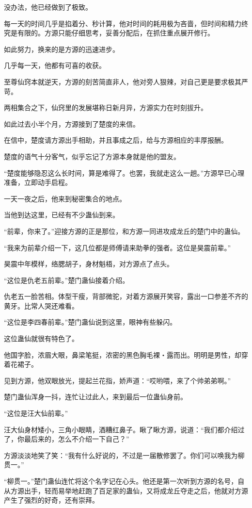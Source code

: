 \begin{this_body}
没办法，他已经做到了极致。

每一天的时间几乎是掐着分、秒计算，他对时间的耗用极为吝啬，但时间和精力终究是有限的。方源只能仔细思考，妥善分配后，在抓住重点展开修行。

如此努力，换来的是方源的迅速进步。

几乎每一天，他都有可喜的收获。

至尊仙窍本就逆天，方源的刻苦简直非人，他对旁人狠辣，对自己更是要求极其严苛。

两相集合之下，仙窍里的发展堪称日新月异，方源实力在时刻拔升。

如此过去小半个月，方源接到了楚度的来信。

在信中，楚度请方源出手相助，并且事成之后，给与方源相应的丰厚报酬。

楚度的语气十分客气，似乎忘记了方源本身就是他的盟友。

“楚度能够隐忍这么长时间，算是难得了。也罢，我就走这么一趟。”方源早已心理准备，立即动手启程。

一天一夜之后，他来到秘密集合的地点。

当他到达这里，已经有不少蛊仙到来。

“前辈，你来了。”迎接方源的正是那位，和方源一同进攻成龙丘的楚门中的蛊仙。

“我来为前辈介绍一下，这几位都是师傅请来助拳的强者。这位是昊震前辈。”

昊震中年模样，络腮胡子，身材魁梧，对方源点了点头。

“这位是仇老五前辈。”楚门蛊仙接着介绍。

仇老五一脸苦相。体型干瘦，背部微驼，对着方源展开笑容，露出一口参差不齐的黄牙。比常人哭还难看。

“这位是李四春前辈。”楚门蛊仙说到这里，眼神有些躲闪。

这位蛊仙就很有特色了。

他国字脸，浓眉大眼，鼻梁笔挺，浓密的黑色胸毛裸・露而出。明明是男性，却穿着花裙子。

见到方源，他双眼放光，提起兰花指，娇声道：“哎哟喂，来了个帅弟弟啊。”

楚门蛊仙浑身一抖，连忙让过此人，来到最后一位蛊仙身前。

“这位是汪大仙前辈。”

汪大仙身材矮小，三角小眼睛，酒糟红鼻子。瞅了瞅方源，说道：“我们都介绍过了，你最后来的，怎么不介绍一下自己？”

方源淡淡地笑了笑：“我有什么好说的，不过是一届散修罢了。你们可以唤我为柳贯一。”

“柳贯一。”楚门蛊仙连忙将这个名字记在心头。他还是第一次听到方源的名号，自从方源出手，轻而易举地赶跑了百足家的蛊仙，又将成龙丘夺走之后，他就对方源产生了强烈的好奇，还有崇拜。


\end{this_body}
